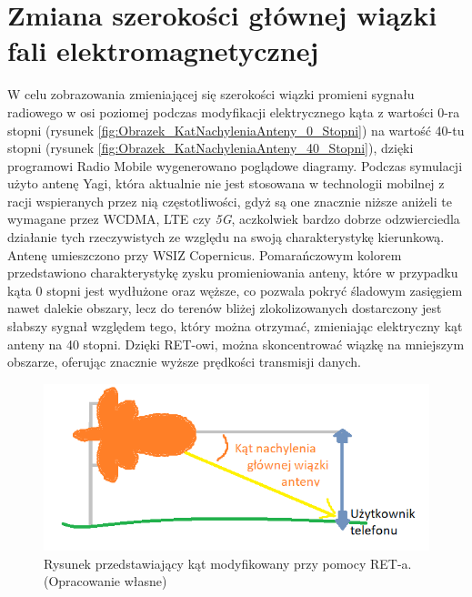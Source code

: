 	\section{Zmiana szerokości głównej wiązki fali elektromagnetycznej}
		W celu zobrazowania zmieniającej się szerokości wiązki promieni sygnału radiowego w osi poziomej\cite{BEAMWIDTH_1}
		podczas modyfikacji elektrycznego kąta z wartości 0-ra stopni (rysunek \ref{fig:Obrazek_KatNachyleniaAnteny_0_Stopni})
		na wartość 40-tu stopni (rysunek \ref{fig:Obrazek_KatNachyleniaAnteny_40_Stopni}), dzięki programowi Radio Mobile\cite{RADIO_MOBILE_PAGE_1} wygenerowano poglądowe diagramy.
		Podczas symulacji użyto antenę Yagi, która aktualnie nie jest stosowana w technologii mobilnej z racji wspieranych
		przez nią częstotliwości, gdyż są one znacznie niższe aniżeli te wymagane przez WCDMA, LTE czy \textit{5G}, 
		aczkolwiek bardzo dobrze odzwierciedla działanie tych rzeczywistych ze względu na swoją charakterystykę kierunkową.
		\newline
		Antenę umieszczono przy WSIZ Copernicus. \newline
		Pomarańczowym kolorem przedstawiono charakterystykę zysku promieniowania anteny, które w przypadku kąta 0 stopni jest wydłużone oraz węższe,
		co pozwala pokryć śladowym zasięgiem nawet dalekie obszary, lecz do terenów bliżej zlokolizowanych dostarczony
		jest słabszy sygnał względem tego, który można otrzymać, zmieniając elektryczny kąt anteny na 40 stopni.
		Dzięki RET-owi, można skoncentrować wiązkę na mniejszym obszarze, oferując znacznie wyższe prędkości transmisji danych.
		\begin{figure}[h!]
			\centering
			\includegraphics[scale=1.0]{Obrazki/KatNachyleniaAnteny.png}
			\caption{Rysunek przedstawiający kąt modyfikowany przy pomocy RET-a.
				\newline(Opracowanie własne)}
			\label{fig:Obrazek_KatNachyleniaAnteny}	
		\end{figure}

